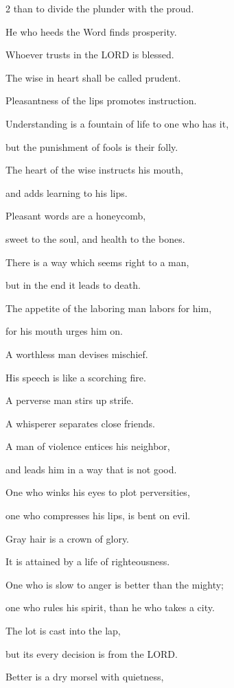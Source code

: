\begin{multicols}{2}
than to divide the plunder with the proud.


\myverse{}He who heeds the Word finds prosperity.

Whoever trusts in the LORD is blessed.


\myverse{}The wise in heart shall be called prudent.

Pleasantness of the lips promotes instruction.


\myverse{}Understanding is a fountain of life to one who has it,

but the punishment of fools is their folly.


\myverse{}The heart of the wise instructs his mouth,

and adds learning to his lips.


\myverse{}Pleasant words are a honeycomb,

sweet to the soul, and health to the bones.


\myverse{}There is a way which seems right to a man,

but in the end it leads to death.


\myverse{}The appetite of the laboring man labors for him,

for his mouth urges him on.


\myverse{}A worthless man devises mischief.

His speech is like a scorching fire.


\myverse{}A perverse man stirs up strife.

A whisperer separates close friends.


\myverse{}A man of violence entices his neighbor,

and leads him in a way that is not good.


\myverse{}One who winks his eyes to plot perversities,

one who compresses his lips, is bent on evil.


\myverse{}Gray hair is a crown of glory.

It is attained by a life of righteousness.


\myverse{}One who is slow to anger is better than the mighty;

one who rules his spirit, than he who takes a city.


\myverse{}The lot is cast into the lap,

but its every decision is from the LORD.


\mychapter{} \myverse*{}Better is a dry morsel with quietness,


\end{multicols}
